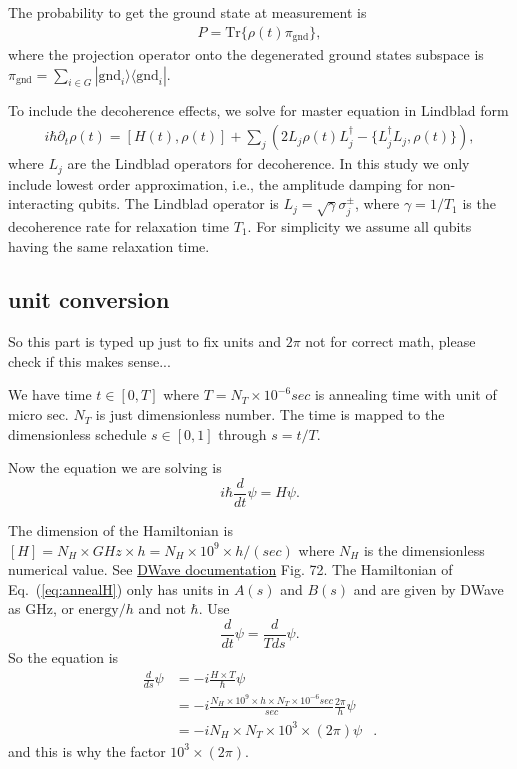 \documentclass[]{article}
\begin{document}
The probability to get the ground state at measurement is
\begin{align}
P =  \mbox{Tr} \{  \rho (t) \pi_{\mbox{gnd}} \}  ,
\end{align}
where the projection operator onto the degenerated ground states subspace is $\pi_{\mbox{gnd}}=\sum_{i\in G} |\mbox{gnd}_i\rangle \langle \mbox{gnd}_i| $.


To include the decoherence effects, we solve for master equation in Lindblad form
\begin{align}
i \hbar \partial_t \rho (t) = [H(t) , \rho(t)] + \sum_j (2L_j \rho(t) L_j^\dagger - \{ L^\dagger_j L_j, \rho(t) \}) ,
\end{align}
where $L_j$ are the Lindblad operators for decoherence. In this study we only include lowest order approximation, i.e., the amplitude damping for non-interacting qubits. The Lindblad operator is $L_j=\sqrt{\gamma} \sigma^\pm_j $, where $\gamma=1/T_1$ is the decoherence rate for relaxation time $T_1$. For simplicity we assume all qubits having the same relaxation time.




\subsection{unit conversion}

So this part is typed up just to fix units and $2\pi$ not for correct math, please check if this makes sense...


We have time $t \in [0,T]$ where $T=N_T \times 10^{-6} sec$ is annealing time with unit of micro sec. $N_T$ is just dimensionless number. The time is mapped to the dimensionless schedule $s\in [0,1]$ through $s=t/T$.

Now the equation we are solving is
\begin{equation}
 i \hbar \frac{d}{dt}\psi = H \psi .
\end{equation}

The dimension of the Hamiltonian is $[H]=N_H \times GHz \times h =N_H \times 10^9  \times h/( sec)$ where $N_H$ is the dimensionless numerical value. See 
\href{https://docs.dwavesys.com/docs/latest/c_qpu_0.html#quantum-annealing-with-ising-spins-in-a-transverse-field}{DWave documentation} Fig. 72. The Hamiltonian of Eq.~(\ref{eq:annealH}) only has units in $A(s)$ and $B(s)$ and are given by DWave as GHz, or $\mathrm{energy}/h$ and not $\hbar$.
Use
\begin{equation}
\frac{d}{dt}\psi = \frac{d}{Tds}\psi .
\end{equation}
So the equation is
\begin{align}
  \frac{d}{ds}\psi  &=  -i \frac{H\times T}{\hbar} \psi  &\\
   &=  -i \frac{N_H \times 10^9 \times h \times N_T \times 10^{-6} sec}{ sec  }\frac{2\pi}{h} \psi &  \\
  &= -i N_H \times N_T \times 10^{3} \times (2\pi) \psi  &.
\end{align}
and this is why the factor $10^{3} \times (2\pi)$.
\end{document}
